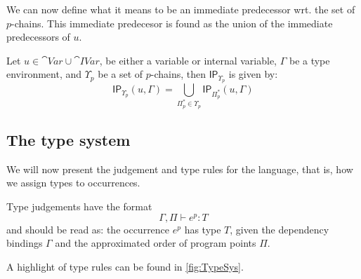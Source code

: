 \documentclass{llncs}
\newcommand{\uf}{\ensuremath{\mathsf{IP}}}
\newcommand{\sqleq}{\ensuremath{\sqsubseteq\xspace}}
\begin{document}

We can now define what it means to be an immediate predecessor
wrt. the set of $p$-chains. This immediate predecesor is found as the
union of the immediate predecessors of $u$.

\begin{definition}\label{def:GBindUps}
	Let $u\in \cat{Var}\cup\cat{IVar}$, be either a variable or internal variable, $\Gamma$ be a type environment, and $\Upsilon_p$ be a set of $p$-chains, then $\uf_{\Upsilon_p}$ is given by:
\[
  \uf_{\Upsilon_p}(u,\Gamma)=\bigcup_{\Pi_p^{*}\in\Upsilon_p}\uf_{\Pi_p^{*}}(u,\Gamma) \]
\end{definition}



\subsection{The type system}\label{sec:Judge}
We will now present the judgement and type rules for the language, that is, how we assign types to occurrences.

Type judgements have the format
%
\[ \Gamma,\Pi\vdash e^p: T \]
%
and should be read as: the occurrence $e^p$ has type $T$, given the
dependency bindings $\Gamma$ and the approximated order of program
points $\Pi$. 

A highlight of type rules can be found in \cref{fig:TypeSys}.
\end{document}
